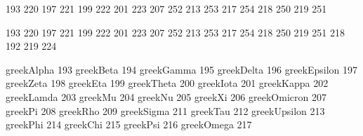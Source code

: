 
 193 220  %
 197 221  %
 199 222  %
 201 223  %
 207 252  %
 213 253  %
 217 254  %
 218 250  %
 219 251  %


 193 220  %
 197 221  %
 199 222  %
 201 223  %
 207 252  %
 213 253  %
 217 254  %
 218 250  %
 219 251  %
 218 192  %
 219 224  %

\stopencoding

\startencoding[iso-8859-7]


 greekAlpha        193
 greekBeta         194
 greekGamma        195
 greekDelta        196
 greekEpsilon      197
 greekZeta         198
 greekEta          199
 greekTheta        200
 greekIota         201
 greekKappa        202
 greekLamda        203
 greekMu           204
 greekNu           205
 greekXi           206
 greekOmicron      207
 greekPi           208
 greekRho          209
 greekSigma        211
 greekTau          212
 greekUpsilon      213
 greekPhi          214
 greekChi          215
 greekPsi          216
 greekOmega        217


